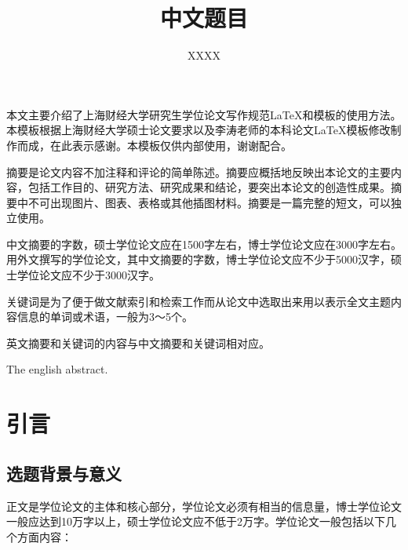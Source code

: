 \documentclass{sufethesismas}
\begin{document}
\classification{}
\confidential{}
\UDC{}
\serialnumber{}
\title{中文题目}
\author{XXXX}


\maketitle

\frontmatter
\begin{abstractCN}
本文主要介绍了上海财经大学研究生学位论文写作规范\LaTeX 和模板的使用方法。本模板根据上海财经大学硕士论文要求以及李涛老师的本科论文\LaTeX 模板修改制作而成，在此表示感谢。本模板仅供内部使用，谢谢配合。

摘要是论文内容不加注释和评论的简单陈述。摘要应概括地反映出本论文的主要内容，包括工作目的、研究方法、研究成果和结论，要突出本论文的创造性成果。摘要中不可出现图片、图表、表格或其他插图材料。摘要是一篇完整的短文，可以独立使用。

中文摘要的字数，硕士学位论文应在1500字左右，博士学位论文应在3000字左右。用外文撰写的学位论文，其中文摘要的字数，博士学位论文应不少于5000汉字，硕士学位论文应不少于3000汉字。

关键词是为了便于做文献索引和检索工作而从论文中选取出来用以表示全文主题内容信息的单词或术语，一般为3～5个。

英文摘要和关键词的内容与中文摘要和关键词相对应。
\end{abstractCN}

\begin{abstractEN}
The english abstract.
\end{abstractEN}


\tableofcontents{}

\mainmatter


\chapter{引言}


\section{选题背景与意义}

正文是学位论文的主体和核心部分，学位论文必须有相当的信息量，博士学位论文一般应达到10万字以上，硕士学位论文应不低于2万字。学位论文一般包括以下几个方面内容：
\end{document}
